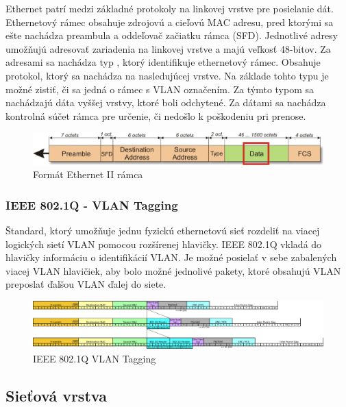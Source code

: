 \documentclass[10pt,a4paper,final]{article}
\begin{document}
Ethernet patrí medzi základné protokoly na linkovej vrstve pre posielanie dát. Ethernetový rámec obsahuje zdrojovú a cieľovú MAC adresu, pred ktorými sa ešte nachádza preambula a oddeľovač začiatku rámca (SFD). Jednotlivé adresy umožňujú adresovať zariadenia na linkovej vrstve a majú veľkosť 48-bitov. Za adresami sa nachádza typ , ktorý identifikuje ethernetový rámec. Obsahuje protokol, ktorý sa nachádza na nasledujúcej vrstve. Na základe tohto typu je možné zistiť, či sa jedná o rámec s VLAN označením. Za týmto typom sa nachádzajú dáta vyššej vrstvy, ktoré boli odchytené. Za dátami sa nachádza kontrolná súčet rámca pre určenie, či nedošlo k poškodeniu pri prenose\cite{ethernetframe}.
\begin{figure}[H]
	\centering
	\includegraphics[scale=0.665, keepaspectratio]{images/ethernet.eps}
	\caption{Formát Ethernet II rámca\cite{ethernetframeimg}}
\end{figure}

\subsubsection{IEEE 802.1Q - VLAN Tagging}

Štandard, ktorý umožňuje jednu fyzickú ethernetovú sieť rozdeliť na viacej logických sietí VLAN pomocou rozšírenej hlavičky\cite{osemdvavlan}. IEEE 802.1Q vkladá do hlavičky informáciu o identifikácií VLAN. Je možné posielať v sebe zabalených viacej VLAN hlavičiek, aby bolo možné jednolivé pakety, ktoré obsahujú VLAN preposlať ďalšou VLAN ďalej do siete.
\begin{figure}[H]
	\centering
	\includegraphics[scale=0.37, keepaspectratio]{images/vlan.eps}
	\caption{IEEE 802.1Q  VLAN Tagging \cite{osemdvavlan}}
\end{figure}

\newpage
\subsection{Sieťová vrstva}
\end{document}
